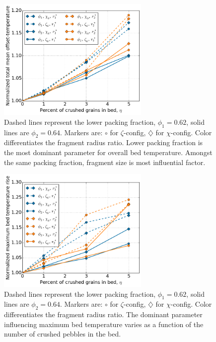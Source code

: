 \begin{figure}[!t]
    \centering
    \includegraphics[width = 0.65\textwidth]{figures/eta-theta.png}
    \caption{Dashed lines represent the lower packing fraction, $\phi_1 = 0.62$, solid lines are $\phi_2 = 0.64$. Markers are: $\circ$ for $\zeta$-config, $\diamondsuit$ for $\chi$-config. Color differentiates the fragment radius ratio. Lower packing fraction is the most dominant parameter for overall bed temperature. Amongst the same packing fraction, fragment size is most influential factor.}\label{fig:eta-theta}
\end{figure}

\begin{figure}[!t]
    \centering
    \includegraphics[width = 0.65\textwidth]{figures/eta-T_max.png}
    \caption{Dashed lines represent the lower packing fraction, $\phi_1 = 0.62$, solid lines are $\phi_2 = 0.64$. Markers are: $\circ$ for $\zeta$-config, $\diamondsuit$ for $\chi$-config. Color differentiates the fragment radius ratio. The dominant parameter influencing maximum bed temperature varies as a function of the number of crushed pebbles in the bed.}\label{fig:eta-T_max}
\end{figure}

